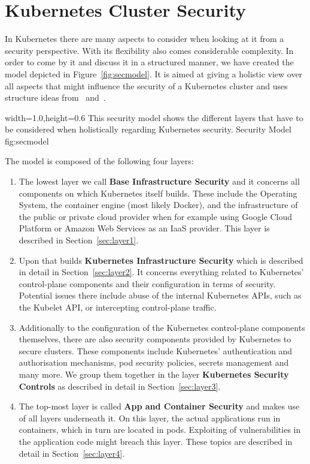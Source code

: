 \chapter{Kubernetes Cluster Security}

In Kubernetes there are many aspects to consider when looking at it from a security perspective. With its flexibility also comes considerable complexity. In order to come by it and discuss it in a structured manner, we have created the model depicted in Figure~\ref{fig:secmodel}. It is aimed at giving a holistic view over all aspects that might influence the security of a Kubernetes cluster and uses structure ideas from~\textcite{securingkubernetes} and~\textcite{kubernetessecurity}.

  {width=1.0\textwidth,height=0.6\textheight}%
  {This security model shows the different layers that have to be considered when holistically regarding Kubernetes security.}%
  {Security Model}%
  {fig:secmodel}%

The model is composed of the following four layers:

\begin{enumerate}
    \item The lowest layer we call \textbf{Base Infrastructure Security} and it concerns all components on which Kubernetes itself builds. These include the Operating System, the container engine (most likely Docker), and the infrastructure of the public or private cloud provider when for example using Google Cloud Platform or Amazon Web Services as an \ac{IaaS} provider. This layer is described in Section~\ref{sec:layer1}.
    \item Upon that builds \textbf{Kubernetes Infrastructure Security} which is described in detail in Section~\ref{sec:layer2}. It concerns everything related to Kubernetes' control-plane components and their configuration in terms of security. Potential issues there include abuse of the internal Kubernetes APIs, such as the Kubelet API, or intercepting control-plane traffic.
    \item Additionally to the configuration of the Kubernetes control-plane components themselves, there are also security components provided by Kubernetes to secure clusters. These components include Kubernetes' authentication and authorisation mechanisms, pod security policies, secrets management and many more. We group them together in the layer \textbf{Kubernetes Security Controls} as described in detail in Section~\ref{sec:layer3}.
    \item The top-most layer is called \textbf{App and Container Security} and makes use of all layers underneath it. On this layer, the actual applications run in containers, which in turn are located in pods. Exploiting of vulnerabilities in the application code might breach this layer. These topics are described in detail in Section~\ref{sec:layer4}.
\end{enumerate}

